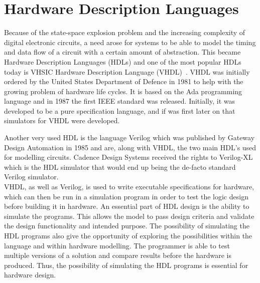 \section{Hardware Description Languages}
Because of the state-space explosion problem and the increasing complexity of digital electronic circuits, a need arose for systems to be able to model the timing and data flow of a circuit with a certain amount of abstraction. This became Hardware Description Languages (HDLs) and one of the most popular HDLs today is VHSIC Hardware Description Language (VHDL)~\cite{VHDL92}\cite{VHDL98}. VHDL was initially ordered by the United States Department of Defence in 1981 to help with the growing problem of hardware life cycles. It is based on the Ada programming language and in 1987 the first IEEE standard was released. Initially, it was developed to be a pure specification language, and if was first later on that simulators for VHDL were developed.

Another very used HDL is the language Verilog which was published by Gateway Design Automation in 1985 and are, along with VHDL, the two main HDL's used for modelling circuits. Cadence Design Systems received the rights to Verilog-XL which is the HDL simulator that would end up being the de-facto standard Verilog simulator.\\

VHDL, as well as Verilog, is used to write executable specifications for hardware, which can then be run in a simulation program in order to test the logic design before building it in hardware. An essential part of HDL design is the ability to simulate the programs. This allows the model to pass design criteria and validate the design functionality and intended purpose. The possibility of simulating the HDL programs also give the opportunity of exploring the possibilities within the language and within hardware modelling. The programmer is able to test multiple versions of a solution and compare results before the hardware is produced. Thus, the possibility of simulating the HDL programs is essential for hardware design.


